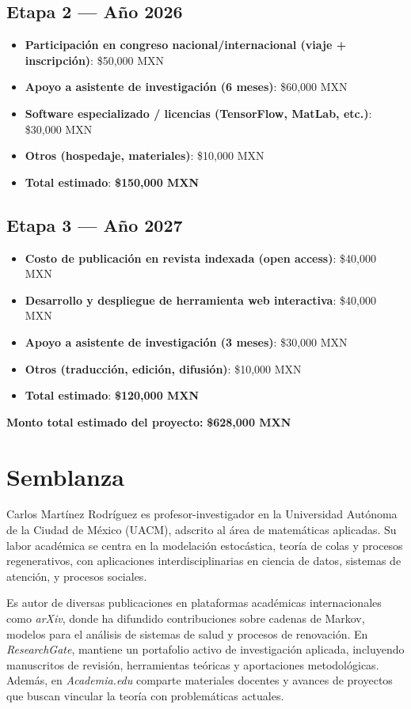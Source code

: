 \documentclass[12pt]{article}
\begin{document}
\subsection*{Etapa 2 — Año 2026}
\begin{itemize}
  \item \textbf{Participación en congreso nacional/internacional (viaje + inscripción)}: \$50,000 MXN
  \item \textbf{Apoyo a asistente de investigación (6 meses)}: \$60,000 MXN
  \item \textbf{Software especializado / licencias (TensorFlow, MatLab, etc.)}: \$30,000 MXN
  \item \textbf{Otros (hospedaje, materiales)}: \$10,000 MXN
  \item \textbf{Total estimado}: \textbf{\$150,000 MXN}
\end{itemize}

\subsection*{Etapa 3 — Año 2027}
\begin{itemize}
  \item \textbf{Costo de publicación en revista indexada (open access)}: \$40,000 MXN
  \item \textbf{Desarrollo y despliegue de herramienta web interactiva}: \$40,000 MXN
  \item \textbf{Apoyo a asistente de investigación (3 meses)}: \$30,000 MXN
  \item \textbf{Otros (traducción, edición, difusión)}: \$10,000 MXN
  \item \textbf{Total estimado}: \textbf{\$120,000 MXN}
\end{itemize}

\textbf{Monto total estimado del proyecto:} \textbf{\$628,000 MXN}

\section{Semblanza}
Carlos Martínez Rodríguez es profesor-investigador en la Universidad Autónoma de la Ciudad de México (UACM), adscrito al área de matemáticas aplicadas. Su labor académica se centra en la modelación estocástica, teoría de colas y procesos regenerativos, con aplicaciones interdisciplinarias en ciencia de datos, sistemas de atención, y procesos sociales.

Es autor de diversas publicaciones en plataformas académicas internacionales como \textit{arXiv}, donde ha difundido contribuciones sobre cadenas de Markov, modelos para el análisis de sistemas de salud y procesos de renovación. En \textit{ResearchGate}, mantiene un portafolio activo de investigación aplicada, incluyendo manuscritos de revisión, herramientas teóricas y aportaciones metodológicas. Además, en \textit{Academia.edu} comparte materiales docentes y avances de proyectos que buscan vincular la teoría con problemáticas actuales.
\end{document}
